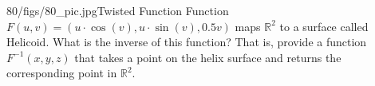 \begin{problem}{80/figs/80_pic.jpg}{Twisted Function} Function $F(u,v) = (u \cdot \cos(v), u \cdot \sin(v), 0.5 v)$ maps $\mathbb{R}^2$	to a surface called Helicoid.
What is the inverse of this function? That is, provide a function $F^{-1}(x,y,z)$ that takes a point on the helix surface and returns the corresponding point in $\mathbb{R}^2$.
\end{problem}
